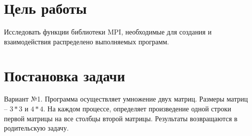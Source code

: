 \documentclass[a4paper,14pt]{extarticle}
\begin{document}


\section{Цель работы}
Исследовать функции библиотеки MPI, необходимые для создания и взаимодействия
распределено выполняемых программ.

\section{Постановка задачи}
Вариант №1. Программа осуществляет умножение двух матриц. Размеры матриц -- $3 * 3$ и
$4 * 4$. На каждом процессе, определяет произведение одной строки первой матрицы на
все столбцы второй матрицы. Результаты возвращаются в родительскую задачу.
\end{document}
